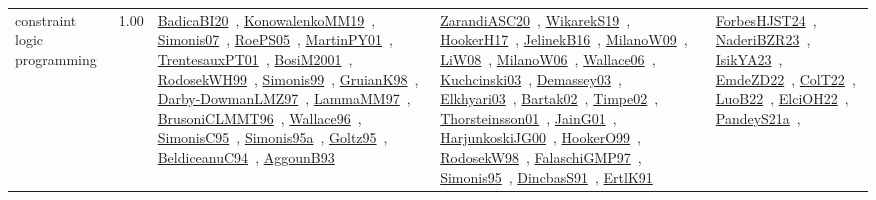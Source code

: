 {\begin{longtable}{p{3cm}r>{\raggedright\arraybackslash}p{6cm}>{\raggedright\arraybackslash}p{6cm}>{\raggedright\arraybackslash}p{8cm}}
\index{constraint logic programming}\index{CP!constraint logic programming}constraint logic programming &  1.00 & \href{../works/BadicaBI20.pdf}{BadicaBI20}~\cite{BadicaBI20}, \href{../works/KonowalenkoMM19.pdf}{KonowalenkoMM19}~\cite{KonowalenkoMM19}, \href{../works/Simonis07.pdf}{Simonis07}~\cite{Simonis07}, \href{../works/RoePS05.pdf}{RoePS05}~\cite{RoePS05}, \href{../works/MartinPY01.pdf}{MartinPY01}~\cite{MartinPY01}, \href{../works/TrentesauxPT01.pdf}{TrentesauxPT01}~\cite{TrentesauxPT01}, \href{../works/BosiM2001.pdf}{BosiM2001}~\cite{BosiM2001}, \href{../works/RodosekWH99.pdf}{RodosekWH99}~\cite{RodosekWH99}, \href{../works/Simonis99.pdf}{Simonis99}~\cite{Simonis99}, \href{../works/GruianK98.pdf}{GruianK98}~\cite{GruianK98}, \href{../works/Darby-DowmanLMZ97.pdf}{Darby-DowmanLMZ97}~\cite{Darby-DowmanLMZ97}, \href{../works/LammaMM97.pdf}{LammaMM97}~\cite{LammaMM97}, \href{../works/BrusoniCLMMT96.pdf}{BrusoniCLMMT96}~\cite{BrusoniCLMMT96}, \href{../works/Wallace96.pdf}{Wallace96}~\cite{Wallace96}, \href{../works/SimonisC95.pdf}{SimonisC95}~\cite{SimonisC95}, \href{../works/Simonis95a.pdf}{Simonis95a}~\cite{Simonis95a}, \href{../works/Goltz95.pdf}{Goltz95}~\cite{Goltz95}, \href{../works/BeldiceanuC94.pdf}{BeldiceanuC94}~\cite{BeldiceanuC94}, \href{../works/AggounB93.pdf}{AggounB93}~\cite{AggounB93} & \href{../works/ZarandiASC20.pdf}{ZarandiASC20}~\cite{ZarandiASC20}, \href{../works/WikarekS19.pdf}{WikarekS19}~\cite{WikarekS19}, \href{../works/HookerH17.pdf}{HookerH17}~\cite{HookerH17}, \href{../works/JelinekB16.pdf}{JelinekB16}~\cite{JelinekB16}, \href{../works/MilanoW09.pdf}{MilanoW09}~\cite{MilanoW09}, \href{../works/LiW08.pdf}{LiW08}~\cite{LiW08}, \href{../works/MilanoW06.pdf}{MilanoW06}~\cite{MilanoW06}, \href{../works/Wallace06.pdf}{Wallace06}~\cite{Wallace06}, \href{../works/Kuchcinski03.pdf}{Kuchcinski03}~\cite{Kuchcinski03}, \href{../works/Demassey03.pdf}{Demassey03}~\cite{Demassey03}, \href{../works/Elkhyari03.pdf}{Elkhyari03}~\cite{Elkhyari03}, \href{../works/Bartak02.pdf}{Bartak02}~\cite{Bartak02}, \href{../works/Timpe02.pdf}{Timpe02}~\cite{Timpe02}, \href{../works/Thorsteinsson01.pdf}{Thorsteinsson01}~\cite{Thorsteinsson01}, \href{../works/JainG01.pdf}{JainG01}~\cite{JainG01}, \href{../works/HarjunkoskiJG00.pdf}{HarjunkoskiJG00}~\cite{HarjunkoskiJG00}, \href{../works/HookerO99.pdf}{HookerO99}~\cite{HookerO99}, \href{../works/RodosekW98.pdf}{RodosekW98}~\cite{RodosekW98}, \href{../works/FalaschiGMP97.pdf}{FalaschiGMP97}~\cite{FalaschiGMP97}, \href{../works/Simonis95.pdf}{Simonis95}~\cite{Simonis95}, \href{../works/DincbasS91.pdf}{DincbasS91}~\cite{DincbasS91}, \href{../works/ErtlK91.pdf}{ErtlK91}~\cite{ErtlK91} & \href{../works/ForbesHJST24.pdf}{ForbesHJST24}~\cite{ForbesHJST24}, \href{../works/NaderiBZR23.pdf}{NaderiBZR23}~\cite{NaderiBZR23}, \href{../works/IsikYA23.pdf}{IsikYA23}~\cite{IsikYA23}, \href{../works/EmdeZD22.pdf}{EmdeZD22}~\cite{EmdeZD22}, \href{../works/ColT22.pdf}{ColT22}~\cite{ColT22}, \href{../works/LuoB22.pdf}{LuoB22}~\cite{LuoB22}, \href{../works/ElciOH22.pdf}{ElciOH22}~\cite{ElciOH22}, \href{../works/PandeyS21a.pdf}{PandeyS21a}~\cite{PandeyS21a}, 
\end{longtable}}
